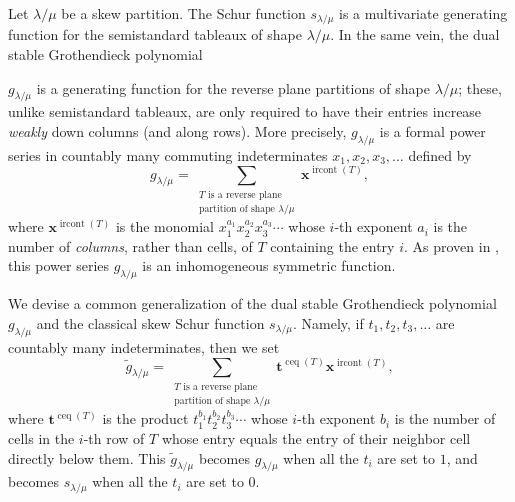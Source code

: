 \documentclass[12pt]{article}
\theoremstyle{plain}
\theoremstyle{definition}
\let\sumnonlimits\sum
\renewcommand{\sum}{\sumnonlimits\limits}
\begin{document}
Let $\lambda/\mu$ be a skew partition. The Schur function $s_{\lambda/\mu}$ is
a multivariate generating function for the semistandard tableaux of shape
$\lambda/\mu$. In the same vein, the dual stable Grothendieck
polynomial 
\begin{comment}
\footnote{The word \textquotedblleft polynomial\textquotedblright%
\ is a stretch: $g_{\lambda/\mu}$ is a bounded-degree power series in
infinitely many indeterminates (like $s_{\lambda/\mu}$).} 
\end{comment}
$g_{\lambda/\mu}$ is
a generating function for the reverse plane partitions of shape $\lambda/\mu$;
these, unlike semistandard tableaux, are only required to have their entries
increase \textit{weakly} down columns (and along rows). More precisely,
$g_{\lambda/\mu}$ is a formal power series in countably many commuting
indeterminates $x_{1},x_{2},x_{3},\ldots$ defined by
\[
g_{\lambda/\mu}=\sum_{\substack{T\text{ is a reverse plane}\\\text{partition
of shape }\lambda/\mu}}\mathbf{x}^{\operatorname*{ircont}\left(  T\right)  },
\]
where $\mathbf{x}^{\operatorname*{ircont}\left(  T\right)  }$ is the monomial
$x_{1}^{a_{1}}x_{2}^{a_{2}}x_{3}^{a_{3}}\cdots$ whose $i$-th exponent $a_{i}$
is the number of \textit{columns}, rather than cells, %
of $T$ containing the entry $i$. As proven in
\cite[\S 9.1]{LamPyl}, this power series $g_{\lambda/\mu}$ is an inhomogeneous symmetric
function.

We devise a common generalization of the dual stable Grothendieck polynomial
$g_{\lambda/\mu}$ and the classical skew Schur function $s_{\lambda/\mu}$.
Namely, if $t_{1},t_{2},t_{3},\ldots$ are countably many indeterminates, then we
set%
\[
\widetilde{g}_{\lambda/\mu}=\sum_{\substack{T\text{ is a reverse
plane}\\\text{partition of shape }\lambda/\mu}}\mathbf{t}^{\operatorname*{ceq}%
\left(  T\right)  }\mathbf{x}^{\operatorname*{ircont}\left(  T\right)  },
\]
where $\mathbf{t}^{\operatorname*{ceq}\left(  T\right)  }$ is the product
$t_{1}^{b_{1}}t_{2}^{b_{2}}t_{3}^{b_{3}}\cdots$ whose $i$-th exponent $b_{i}$
is the number of cells in the $i$-th row of $T$ whose entry equals the entry
of their neighbor cell directly below them. This $\widetilde{g}_{\lambda/\mu}$
becomes $g_{\lambda/\mu}$ when all the $t_{i}$ are set to $1$, and becomes
$s_{\lambda/\mu}$ when all the $t_{i}$ are set to $0$.
\end{document}
